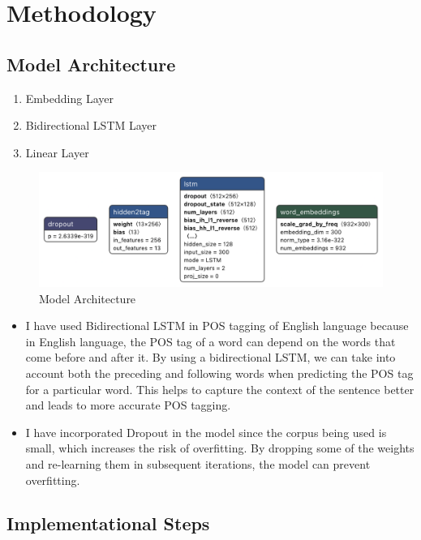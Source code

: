 
\section{Methodology}


\subsection{Model Architecture}

\begin{enumerate}
			\item Embedding Layer
			\item Bidirectional LSTM Layer
			\item Linear Layer
\end{enumerate}

\begin{figure}[h]
	\includegraphics[scale=0.4]{img/model_arch.png}
	\caption{Model Architecture}
\end{figure}

\begin{itemize}
	\item I have used Bidirectional LSTM in POS tagging of English language because in English language, the POS tag of a word can depend on the words that come before and after it. By using a bidirectional LSTM, we can take into account both the preceding and following words when predicting the POS tag for a particular word. This helps to capture the context of the sentence better and leads to more accurate POS tagging.
	\item I have incorporated Dropout in the model since the corpus being used is small, which increases the risk of overfitting. By dropping some of the weights and re-learning them in subsequent iterations, the model can prevent overfitting.
\end{itemize}


\subsection{Implementational Steps}

